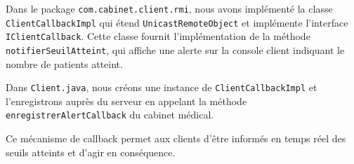 \documentclass{article} %
\begin{document}
Dans le package \texttt{com.cabinet.client.rmi}, nous avons implémenté la classe \texttt{ClientCallbackImpl} qui étend \texttt{UnicastRemoteObject} et implémente l'interface \texttt{IClientCallback}. Cette classe fournit l'implémentation de la méthode \texttt{notifierSeuilAtteint}, qui affiche une alerte sur la console client indiquant le nombre de patients atteint.

Dans \texttt{Client.java}, nous créons une instance de \texttt{ClientCallbackImpl} et l'enregistrons auprès du serveur en appelant la méthode \texttt{enregistrerAlertCallback} du cabinet médical.


Ce mécanisme de callback permet aux clients d'être informés en temps réel des seuils atteints et d'agir en conséquence.
\end{document}

